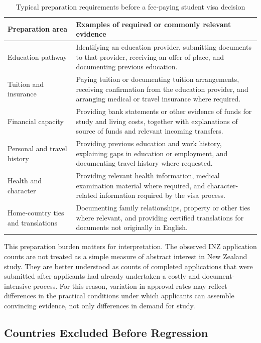 \documentclass[runningheads]{llncs}
\begin{document}
\begin{table}
\caption{Typical preparation requirements before a fee-paying student visa decision}
\label{tab:appendix-student-visa-preparation}
\centering
\renewcommand{\arraystretch}{1.2}
\setlength{\tabcolsep}{6pt}
\begin{tabular}{p{}p{}}
\hline
Preparation area & Examples of required or commonly relevant evidence \\
\hline
Education pathway & Identifying an education provider, submitting documents to that provider, receiving an offer of place, and documenting previous education. \\
Tuition and insurance & Paying tuition or documenting tuition arrangements, receiving confirmation from the education provider, and arranging medical or travel insurance where required. \\
Financial capacity & Providing bank statements or other evidence of funds for study and living costs, together with explanations of source of funds and relevant incoming transfers. \\
Personal and travel history & Providing previous education and work history, explaining gaps in education or employment, and documenting travel history where requested. \\
Health and character & Providing relevant health information, medical examination material where required, and character-related information required by the visa process. \\
Home-country ties and translations & Documenting family relationships, property or other ties where relevant, and providing certified translations for documents not originally in English. \\
\hline
\end{tabular}
\end{table}

This preparation burden matters for interpretation. The observed INZ application counts are not treated as a simple measure of abstract interest in New Zealand study. They are better understood as counts of completed applications that were submitted after applicants had already undertaken a costly and document-intensive process. For this reason, variation in approval rates may reflect differences in the practical conditions under which applicants can assemble convincing evidence, not only differences in demand for study.

\subsection{Countries Excluded Before Regression}
\end{document}
